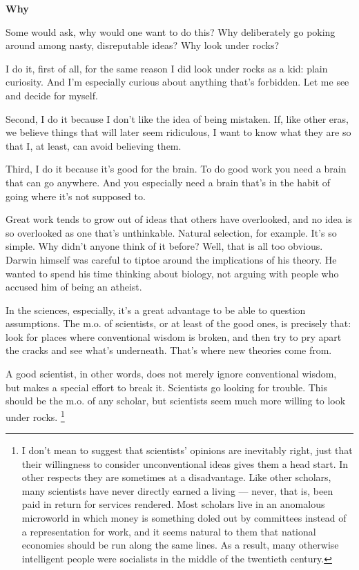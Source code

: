 \documentclass[12pt]{book}
\begin{document}
\textbf{Why}

Some would ask, why would one want to do this? Why deliberately go
poking around among nasty, disreputable ideas? Why look under rocks?

I do it, first of all, for the same reason I did look under rocks as a
kid: plain curiosity. And I'm especially curious about anything that's
forbidden. Let me see and decide for myself.

Second, I do it because I don't like the idea of being mistaken. If,
like other eras, we believe things that will later seem ridiculous, I
want to know what they are so that I, at least, can avoid believing
them.

Third, I do it because it's good for the brain. To do good work you need
a brain that can go anywhere. And you especially need a brain that's in
the habit of going where it's not supposed to.

Great work tends to grow out of ideas that others have overlooked, and
no idea is so overlooked as one that's unthinkable. Natural selection,
for example. It's so simple. Why didn't anyone think of it before? Well,
that is all too obvious. Darwin himself was careful to tiptoe around the
implications of his theory. He wanted to spend his time thinking about
biology, not arguing with people who accused him of being an atheist.

In the sciences, especially, it's a great advantage to be able to
question assumptions. The m.o. of scientists, or at least of the good
ones, is precisely that: look for places where conventional wisdom is
broken, and then try to pry apart the cracks and see what's underneath.
That's where new theories come from.

A good scientist, in other words, does not merely ignore conventional
wisdom, but makes a special effort to break it. Scientists go looking
for trouble. This should be the m.o. of any scholar, but scientists seem
much more willing to look under rocks. \footnote{I don't mean to suggest that scientists' opinions are
inevitably right, just that their willingness to consider unconventional
ideas gives them a head start. In other respects they are sometimes at a
disadvantage. Like other scholars, many scientists have never directly
earned a living --- never, that is, been paid in return for services
rendered. Most scholars live in an anomalous microworld in which money
is something doled out by committees instead of a representation for
work, and it seems natural to them that national economies should be run
along the same lines. As a result, many otherwise intelligent people
were socialists in the middle of the twentieth century.}
\end{document}
